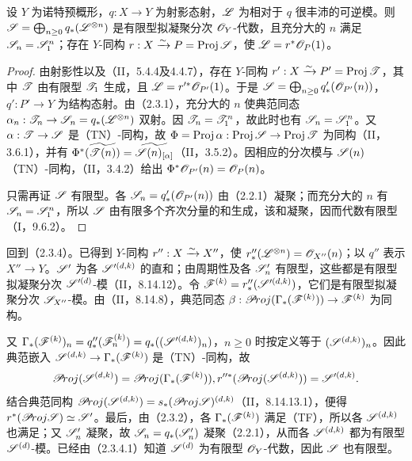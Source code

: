 设 $Y$ 为诺特预概形，$q:X\to Y$ 为射影态射，$\mathscr L$ 为相对于 $q$ 很丰沛的可逆模。则 $\mathscr S=\bigoplus_{n\geq0}q_*(\mathscr L^{\otimes n})$ 是有限型拟凝聚分次 $\mathscr O_Y$-代数，且充分大的 $n$ 满足 $\mathscr S_n=\mathscr S_1^n$；存在 $Y$-同构 $r:X\xrightarrow{\sim} P=\operatorname{Proj}\mathscr S$，使 $\mathscr L=r^*\mathscr O_P(1)$。
\begin{proof}
由射影性以及（II，5.4.4及4.4.7），存在 $Y$-同构 $r':X\xrightarrow{\sim} P'=\operatorname{Proj}\mathscr T$，其中 $\mathscr T$ 由有限型 $\mathscr T_1$ 生成，且 $\mathscr L=r'^*\mathscr O_{P'}(1)$。于是 $\mathscr S=\bigoplus_{n\geq0}q'_*(\mathscr O_{P'}(n))$，$q':P'\to Y$ 为结构态射。由（2.3.1），充分大的 $n$ 使典范同态 $\alpha_n:\mathscr T_n\to\mathscr S_n=q_*(\mathscr L^{\otimes n})$ 双射。因 $\mathscr T_n=\mathscr T_1^n$，故此时也有 $\mathscr S_n=\mathscr S_1^n$。又 $\alpha:\mathscr T\to\mathscr S$ 是（TN）-同构，故 $\Phi=\operatorname{Proj}\alpha:\operatorname{Proj}\mathscr S\to\operatorname{Proj}\mathscr T$ 为同构（II，3.6.1），并有 $\Phi^*(\widetilde{\mathscr T(n)})=\widetilde{\mathscr S(n)_{[\alpha]}}$（II，3.5.2）。因相应的分次模与 $\mathscr S(n)$（TN）-同构，（II，3.4.2）给出 $\Phi^*\mathscr O_{P'}(n)=\mathscr O_P(n)$。

只需再证 $\mathscr S$ 有限型。各 $\mathscr S_n=q'_*(\mathscr O_{P'}(n))$ 由（2.2.1）凝聚；而充分大的 $n$ 有 $\mathscr S_n=\mathscr S_1^n$，所以 $\mathscr S$ 由有限多个齐次分量的和生成，该和凝聚，因而代数有限型（I，9.6.2）。
\end{proof}
回到（2.3.4）。已得到 $Y$-同构 $r'':X\xrightarrow{\sim} X''$，使 $r''_*(\mathscr L^{\otimes n})=\mathscr O_{X''}(n)$；以 $q''$ 表示 $X''\to Y$。$\mathscr S'$ 为各 $\mathscr S'^{(d,k)}$ 的直和；由周期性及各 $\mathscr S'_n$ 有限型，这些都是有限型拟凝聚分次 $\mathscr S'^{(d)}$-模（II，8.14.12）。令
$\mathscr F^{(k)}=r''_*(\mathscr S'^{(d,k)})$，它们是有限型拟凝聚分次 $\mathscr S_{X''}$-模。由（II，8.14.8），典范同态
$\beta:\mathscr{P}\!roj(\Gamma_*(\mathscr F^{(k)}))\to\mathscr F^{(k)}$ 为同构。

又 $\Gamma_*(\mathscr F^{(k)})_n=q''_*(\mathscr F_n^{(k)})=q_*((\mathscr S'^{(d,k)})_n)$，$n\geq0$ 时按定义等于 $(\mathscr S^{(d,k)})_n$。因此典范嵌入 $\mathscr S^{(d,k)}\to\Gamma_*(\mathscr F^{(k)})$ 是（TN）-同构，故
\[
\mathscr{P}\!roj(\mathscr S^{(d,k)})=\mathscr{P}\!roj(\Gamma_*(\mathscr F^{(k)})),
r''^*(\mathscr{P}\!roj(\mathscr S^{(d,k)}))=\mathscr S'^{(d,k)}.
\]
结合典范同构
$\mathscr{P}\!roj(\mathscr S^{(d,k)})=s_*(\mathscr{P}\!roj\mathscr S)^{(d,k)}$（II，8.14.13.1），便得 $r^*(\mathscr{P}\!roj\mathscr S)\simeq\mathscr S'$。最后，由（2.3.2），各 $\Gamma_*(\mathscr F^{(k)})$ 满足（TF），所以各 $\mathscr S^{(d,k)}$ 也满足；又 $\mathscr S'_n$ 凝聚，故 $\mathscr S_n=q_*(\mathscr S'_n)$ 凝聚（2.2.1），从而各 $\mathscr S^{(d,k)}$ 都为有限型 $\mathscr S^{(d)}$-模。已经由（2.3.4.1）知道 $\mathscr S^{(d)}$ 为有限型 $\mathscr O_Y$-代数，因此 $\mathscr S$ 也有限型。\finishproof

